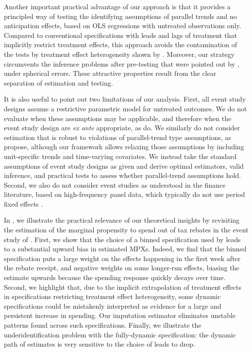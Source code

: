 \documentclass[english,11pt]{article}
\theoremstyle{plain}
\theoremstyle{plain}
\theoremstyle{plain}
\theoremstyle{plain}
\let\ref\Cref
\begin{document}
Another important practical advantage of our approach is that it provides
a principled way of testing the identifying assumptions of parallel
trends and no anticipation effects, based on OLS regressions with
untreated observations only. Compared to conventional specifications
with leads and lags of treatment that implicitly restrict treatment
effects, this approach avoids the contamination of the tests by treatment
effect heterogeneity shown by \textcite{Abraham2018}. Moreover, our
strategy circumvents the inference problems after pre-testing that
were pointed out by \textcite{Roth2018a}, under spherical errors.
These attractive properties result from the clear separation of estimation
and testing.

It is also useful to point out two limitations of our analysis. First,
all event study designs assume a restrictive parametric model for
untreated outcomes. We do not evaluate when these assumptions may
be applicable, and therefore when the event study design are \emph{ex
ante }appropriate, as \textcite{Roth2020} do. We similarly do not
consider estimation that is robust to violations of parallel-trend
type assumptions, as \textcite{Roth2019} propose, although our framework
allows relaxing those assumptions by including unit-specific trends
and time-varying covariates. We instead take the standard assumptions
of event study designs as given and derive optimal estimators, valid
inference, and practical tests to assess whether parallel-trend assumptions
hold. Second, we also do not consider event studies as understood
in the finance literature, based on high-frequency panel data, which
typically do not use period fixed effects \parencite{MacKinlay1997}.

In \ref{sec:Application}, we illustrate the practical relevance of
our theoretical insights by revisiting the estimation of the marginal
propensity to spend out of tax rebates in the event study of \textcite{Broda2014}.
First, we show that the choice of a binned specification used by \textcite{Broda2014}
leads to a substantial upward bias in estimated MPXs. Indeed, we find
that the binned specification puts a large weight on the effects happening
in the first week after the rebate receipt, and negative weights on
some longer-run effects, biasing the estimate upwards because the
spending response quickly decays over time. Second, we highlight that,
due to the implicit extrapolation of treatment effects in specifications
restricting treatment effect heterogeneity, some dynamic specifications
could be mistakenly interpreted as evidence for a large and persistent
increase in spending. Our imputation estimator eliminates unstable
patterns found across such specifications. Finally, we illustrate
the underidentification problem with the fully-dynamic specification:
the dynamic path of estimates is very sensitive to the choice of leads
to drop.
\end{document}
